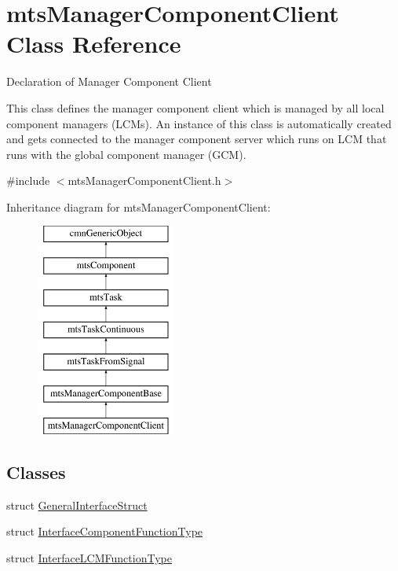 \hypertarget{classmts_manager_component_client}{}\section{mts\+Manager\+Component\+Client Class Reference}
\label{classmts_manager_component_client}


Declaration of Manager Component Client

This class defines the manager component client which is managed by all local component managers (L\+C\+Ms). An instance of this class is automatically created and gets connected to the manager component server which runs on L\+C\+M that runs with the global component manager (G\+C\+M).  




{\ttfamily \#include $<$mts\+Manager\+Component\+Client.\+h$>$}

Inheritance diagram for mts\+Manager\+Component\+Client\+:\begin{figure}[H]
\begin{center}
\leavevmode
\includegraphics[height=7.000000cm]{dd/d51/classmts_manager_component_client}
\end{center}
\end{figure}
\subsection*{Classes}
\begin{DoxyCompactItemize}
\item 
struct \hyperlink{structmts_manager_component_client_1_1_general_interface_struct}{General\+Interface\+Struct}
\item 
struct \hyperlink{structmts_manager_component_client_1_1_interface_component_function_type}{Interface\+Component\+Function\+Type}
\item 
struct \hyperlink{structmts_manager_component_client_1_1_interface_l_c_m_function_type}{Interface\+L\+C\+M\+Function\+Type}
\end{DoxyCompactItemize}

